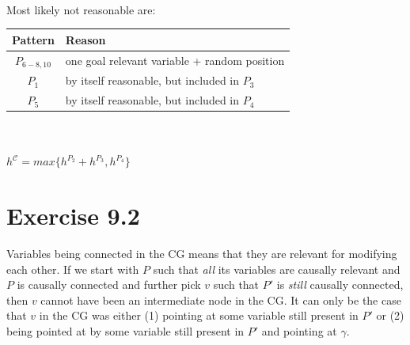 \documentclass[11pt,a4paper]{article}
\begin{document}
\\
Most likely not reasonable are:\\
\begin{tabular}{c|l}
Pattern & Reason\\
\hline
$P_{6-8,10}$ & one goal relevant variable + random position\\
$P_1$ & by itself reasonable, but included in $P_3$\\
$P_5$ & by itself reasonable, but included in $P_4$\\
\end{tabular}\\
\\
$h^\mathscr{C}=max\{h^{P_2}+h^{P_3},h^{P_4}\}$\\

\section*{Exercise 9.2}
Variables being connected in the CG means that they are relevant for modifying each other. If we start with $P$ such that \emph{all} its variables are causally relevant and $P$ is causally connected and further pick $v$ such that $P'$ is \emph{still} causally connected, then $v$ cannot have been an intermediate node in the CG. It can only be the case that $v$ in the CG was either (1) pointing at some variable still present in $P'$ or (2) being pointed at by some variable still present in $P'$ and pointing at $\gamma$.

\label{lastpage}
\end{document}
